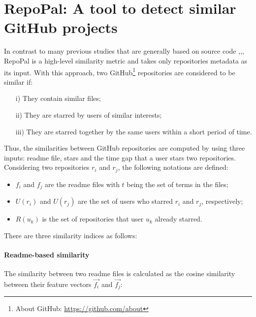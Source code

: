 \section{RepoPal: A tool to detect similar GitHub projects} \label{sec:repopal}

In contrast to many previous studies that are generally based on source code \cite{10.1109/APSEC.2004.69},\cite{Liu:2006:GDS:1150402.1150522},\cite{McMillan:2012:DSS:2337223.2337267}, RepoPal  \cite{10.1109/SANER.2017.7884605} is a high-level similarity metric and takes only repositories metadata as its input. With this approach, two GitHub\footnote{About GitHub: \url{https://github.com/about}} repositories are considered to be similar if:

\begin{itemize}
	\item[i)] They contain similar  files;
	\item[ii)] They are starred by users of similar interests;
	\item[iii)] They are starred together by the same users within a short period of time. 
\end{itemize}

Thus, the similarities between GitHub repositories are computed by using three inputs: readme file, stars and the time gap that a user stars two repositories. Considering two repositories $ r_{i} $ and $ r_{j} $, the following notations are defined: 

\begin{itemize}
	\item $ f_{i} $ and $ f_{j} $ are the readme files with $ t $ being the set of terms in the files; 
	\item $ U(r_{i}) $ and $ U(r_{j}) $ are the set of users who starred $ r_{i} $ and $ r_{j} $, respectively; 
	\item $ R(u_{k}) $ is the set of repositories that user $ u_{k} $ already starred.  
\end{itemize}

There are three similarity indices as follows:

\paragraph{Readme-based similarity} 

The similarity between two readme files is calculated as the cosine similarity between their feature vectors $\vec{f_{i}}$ and $\vec{f_{j}}$: 


